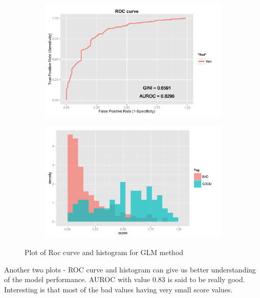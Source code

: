 \documentclass[10pt]{article}\usepackage[]{graphicx}\usepackage[]{color}
\begin{document}
\begin{figure}[h!]
        \centering
        \begin{subfigure}[b]{0.45\textwidth}
                \includegraphics[width=\textwidth]{Plots/ROC_GLM}
                \caption{}
                \label{fig:ROC_ GLM}
        \end{subfigure}
        \begin{subfigure}[b]{0.45\textwidth}
                \includegraphics[width=\textwidth]{Plots/HIST_GLM}
                \label{fig:HIST_ GLM}
        \end{subfigure}

        \caption{Plot of Roc curve and histogram for GLM method}\label{fig:GLM}
\end{figure}

Another two plots - ROC curve and histogram can give us better understanding of the model performance. AUROC with value 0.83 is said to be really good. Interesting is that most of the bad values having very small score values. 
\end{document}
